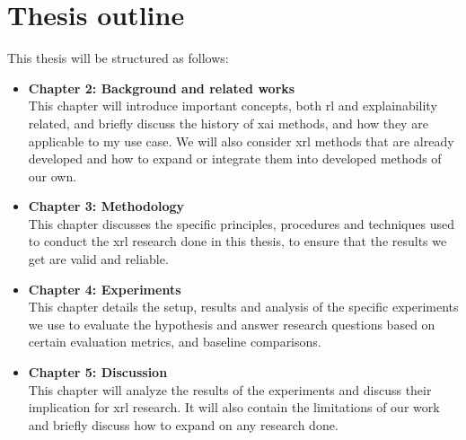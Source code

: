 \documentclass[UKenglish]{uiomasterthesis}
\begin{document}
\section{Thesis outline}
This thesis will be structured as follows:
\begin{itemize}

    \item \textbf{Chapter 2: Background and related works}\\
        This chapter will introduce important concepts, both \ac{rl} and explainability related, and briefly discuss the history of \ac{xai} methods, and how they are applicable to my use case. We will also consider \ac{xrl} methods that are already developed and how to expand or integrate them into developed methods of our own.

    \item \textbf{Chapter 3: Methodology}\\
        This chapter discusses the specific principles, procedures and techniques used to conduct the \ac{xrl} research done in this thesis, to ensure that the results we get are valid and reliable.

    \item \textbf{Chapter 4: Experiments}\\
        This chapter details the setup, results and analysis of the specific experiments we use to evaluate the hypothesis and answer research questions based on certain evaluation metrics, and baseline comparisons.

    \item \textbf{Chapter 5: Discussion}\\
        This chapter will analyze the results of the experiments and discuss their implication for \ac{xrl} research. It will also contain the limitations of our work and briefly discuss how to expand on any research done.
\end{itemize}
\end{document}
